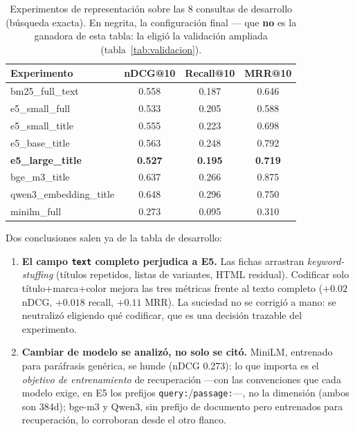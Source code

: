 \documentclass[10pt,twocolumn]{article}
\newcommand{\code}[1]{\texttt{\small #1}}
\begin{document}
\begin{table}[h]
  \centering\small
  \caption{Experimentos de representación sobre las 8 consultas de
  desarrollo (búsqueda exacta). En negrita, la configuración final --- que
  \textbf{no} es la ganadora de esta tabla: la eligió la validación ampliada
  (tabla~\ref{tab:validacion}).}
  \label{tab:experimentos}
  \begin{tabular}{@{}lccc@{}}
    \toprule
    Experimento & nDCG@10 & Recall@10 & MRR@10 \\
    \midrule
    bm25\_full\_text & 0.558 & 0.187 & 0.646 \\
    e5\_small\_full & 0.533 & 0.205 & 0.588 \\
    e5\_small\_title & 0.555 & 0.223 & 0.698 \\
    e5\_base\_title & 0.563 & 0.248 & 0.792 \\
    \textbf{e5\_large\_title} & \textbf{0.527} & \textbf{0.195} & \textbf{0.719} \\
    bge\_m3\_title & 0.637 & 0.266 & 0.875 \\
    qwen3\_embedding\_title & 0.648 & 0.296 & 0.750 \\
    minilm\_full & 0.273 & 0.095 & 0.310 \\
    \bottomrule
  \end{tabular}
\end{table}

Dos conclusiones salen ya de la tabla de desarrollo:

\begin{enumerate}
  \item \textbf{El campo \code{text} completo perjudica a E5.} Las fichas
  arrastran \emph{keyword-stuffing} (títulos repetidos, listas de variantes,
  HTML residual). Codificar solo título+marca+color mejora las tres métricas
  frente al texto completo ($+0.02$ nDCG, $+0.018$ recall, $+0.11$ MRR). La
  suciedad no se corrigió a mano: se neutralizó eligiendo qué codificar, que
  es una decisión trazable del experimento.
  \item \textbf{Cambiar de modelo se analizó, no solo se citó.} MiniLM,
  entrenado para paráfrasis genérica, se hunde (nDCG 0.273): lo que importa
  es el \emph{objetivo de entrenamiento} de recuperación ---con las
  convenciones que cada modelo exige, en E5 los prefijos
  \code{query:}/\code{passage:}---, no la dimensión (ambos son 384d); bge-m3
  y Qwen3, sin prefijo de documento pero entrenados para recuperación, lo
  corroboran desde el otro flanco.
\end{enumerate}
\end{document}

